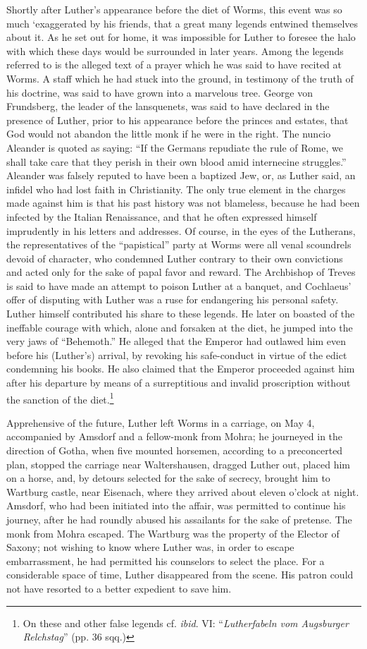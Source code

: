 Shortly after Luther’s appearance before the diet of Worms, this
event was so much ‘exaggerated by his friends, that a great many
legends entwined themselves about it. As he set out for home, it
was impossible for Luther to foresee the halo with which these days
would be surrounded in later years. Among the legends referred to is
the alleged text of a prayer which he was said to have recited at
Worms. A staff which he had stuck into the ground, in testimony of
the truth of his doctrine, was said to have grown into a marvelous tree.
George von Frundsberg, the leader of the lansquenets, was
said to have declared in the presence of Luther, prior to his appearance
before the princes and estates, that God would not abandon
the little monk if he were in the right. The nuncio Aleander is
quoted as saying: “If the Germans repudiate the rule of Rome,
we shall take care that they perish in their own blood amid internecine
struggles.” Aleander was falsely reputed to have been a baptized
Jew, or, as Luther said, an infidel who had lost faith in Christianity.
The only true element in the charges made against him is that his
past history was not blameless, because he had been infected by
the Italian Renaissance, and that he often expressed himself imprudently
in his letters and addresses. Of course, in the eyes of the
Lutherans, the representatives of the “papistical” party at Worms
were all venal scoundrels devoid of character, who condemned
Luther contrary to their own convictions and acted only for the
sake of papal favor and reward. The Archbishop of Treves is
said to have made an attempt to poison Luther at a banquet, and
Cochlaeus’ offer of disputing with Luther was a ruse for endangering his
personal safety. Luther himself contributed his share to these
legends. He later on boasted of the ineffable courage with which,
alone and forsaken at the diet, he jumped into the very jaws of
“Behemoth.” He alleged that the Emperor had outlawed him even
before his (Luther’s) arrival, by revoking his safe-conduct in virtue
of the edict condemning his books. He also claimed that the Emperor
proceeded against him after his departure by means of a surreptitious
and invalid proscription without the sanction of the diet.\footnote
{On these and other false legends cf. \textit{ibid}. VI: “\textit{Lutherfabeln vom Augsburger
Relchstag}” (pp. 36 sqq.)}

Apprehensive of the future, Luther left Worms in a carriage, on
May 4, accompanied by Amsdorf and a fellow-monk from Mohra;
he journeyed in the direction of Gotha, when five mounted horsemen, according
to a preconcerted plan, stopped the carriage near
Waltershausen, dragged Luther out, placed him on a horse, and, by
detours selected for the sake of secrecy, brought him to Wartburg
castle, near Eisenach, where they arrived about eleven o’clock at
night. Amsdorf, who had been initiated into the affair, was permitted
to continue his journey, after he had roundly abused his
assailants for the sake of pretense. The monk from Mohra escaped.
The Wartburg was the property of the Elector of Saxony; not
wishing to know where Luther was, in order to escape embarrassment,
he had permitted his counselors to select the place. For a considerable
space of time, Luther disappeared from the scene. His patron could
not have resorted to a better expedient to save him.
